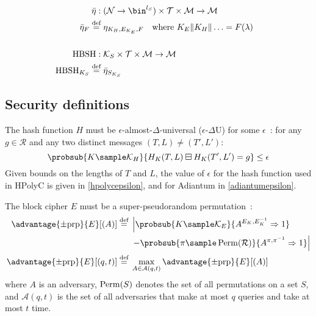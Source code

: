 \documentclass[eprint.tex]{subfiles}
\begin{document}
\begin{align*}
    \allowdisplaybreaks[4] \vphantom{|} \\ \allowdisplaybreaks[0]
    \bar{\eta} :{}& (\mathcal{N} \rightarrow \bin^{l_S}) \times \mathcal{T} \times \mathcal{M} \rightarrow \mathcal{M} \\
    \bar{\eta}_{F} \defeq{}& \eta_{K_H, E_{K_E}, F} \quad \textrm{where} \ K_E \Concat K_H \Concat \ldots = F(\lambda) \\
    \allowdisplaybreaks[4] \vphantom{|} \\ \allowdisplaybreaks[0]
    \HBSH :{}& \mathcal{K}_S \times \mathcal{T} \times \mathcal{M} \rightarrow \mathcal{M} \\
    \HBSH_{K_S} \defeq{}& \bar{\eta}_{S_{K_S}} \\
\end{align*}

\subsection{Security definitions}
The hash function $H$
must be $\epsilon$-almost-$\Delta$-universal\label{eadudef}
($\epsilon$-$\Delta$U)
for some $\epsilon$~\cite{eadu}:
for any $g \in \mathcal{R}$ and
any two distinct messages $(T, L) \neq (T', L')$:
%
\begin{displaymath}
\probsub{K \sample \mathcal{K}_H}{H_{K}(T, L) \boxminus H_{K}(T', L') = g} \leq \epsilon
\end{displaymath}
%
Given bounds on the lengths of $T$ and $L$, the value of $\epsilon$ for the
hash function used in HPolyC is given in \autoref{hpolycepsilon},
and for Adiantum in \autoref{adiantumepsilon}.

The block cipher
$E$
must be a super-pseudorandom permutation~\cite{concsym}:
%
\begin{align*}
    \advantage{\pm \mathrm{prp}}{E}[(A)] \defeq
    {}&\left\lvert\probsub{K \sample \mathcal{K}_E}{A^{E_K,E_K^{-1}}\Rightarrow 1}\right.
    \\
    {}&\left. - \probsub{\pi \sample \Perm(\mathcal{R})}{A^{\pi,\pi^{-1}}\Rightarrow 1}\right\rvert
    \\
    \advantage{\pm \mathrm{prp}}{E}[(q, t)] \defeq
    {}&\max_{A \in \mathcal{A}(q, t)} \advantage{\pm \mathrm{prp}}{E}[(A)]
\end{align*}
%
where $A$ is an adversary,
$\operatorname{Perm}(S)$ denotes the set of all permutations on a set $S$,
and
$\mathcal{A}(q, t)$
is the set of all adversaries that make at most $q$ queries and take at most $t$ time.
\end{document}
